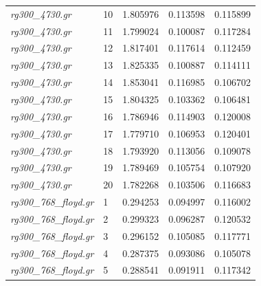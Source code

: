 \documentclass[12pt]{article}
\begin{document}
\begin{longtable}{l|l|lll}
\textit{rg300\_4730.gr}          &  10       & 1.805976               & 0.113598             & 0.115899                     \\
\textit{rg300\_4730.gr}          &  11       & 1.799024               & 0.100087             & 0.117284                     \\
\textit{rg300\_4730.gr}          &  12       & 1.817401               & 0.117614             & 0.112459                     \\
\textit{rg300\_4730.gr}          &  13       & 1.825335               & 0.100887             & 0.114111                     \\
\textit{rg300\_4730.gr}          &  14       & 1.853041               & 0.116985             & 0.106702                     \\
\textit{rg300\_4730.gr}          &  15       & 1.804325               & 0.103362             & 0.106481                     \\
\textit{rg300\_4730.gr}          &  16       & 1.786946               & 0.114903             & 0.120008                     \\
\textit{rg300\_4730.gr}          &  17       & 1.779710               & 0.106953             & 0.120401                     \\
\textit{rg300\_4730.gr}          &  18       & 1.793920               & 0.113056             & 0.109078                     \\
\textit{rg300\_4730.gr}          &  19       & 1.789469               & 0.105754             & 0.107920                     \\
\textit{rg300\_4730.gr}          &  20       & 1.782268               & 0.103506             & 0.116683                     \\ \hline
\textit{rg300\_768\_floyd.gr}    &  1        & 0.294253               & 0.094997             & 0.116002                     \\
\textit{rg300\_768\_floyd.gr}    &  2        & 0.299323               & 0.096287             & 0.120532                     \\
\textit{rg300\_768\_floyd.gr}    &  3        & 0.296152               & 0.105085             & 0.117771                     \\
\textit{rg300\_768\_floyd.gr}    &  4        & 0.287375               & 0.093086             & 0.105078                     \\
\textit{rg300\_768\_floyd.gr}    &  5        & 0.288541               & 0.091911             & 0.117342                     \\

\end{longtable}
\end{document}
